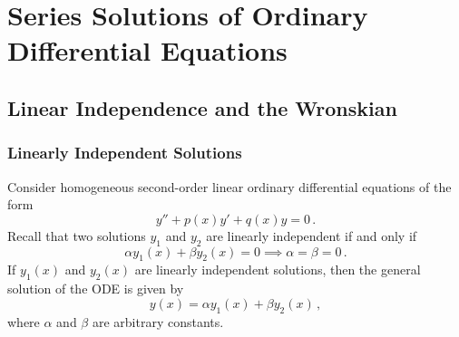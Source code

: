 \documentclass{article}
\theoremstyle{plain}\theoremheaderfont{\normalfont\itshape}\theorembodyfont{\rmfamily}\theoremseparator{.}\newtheorem*{rem}{Remark}\newtheorem*{ex}{Example}\newtheorem*{proof}{Proof}\newtheorem*{altp}{Alternative proof}
\theoremstyle{plain}\theoremheaderfont{\normalfont\bfseries}\theorembodyfont{\rmfamily}\theoremseparator{.}\newtheorem{thm}{Theorem}[section]\newtheorem{lem}[thm]{Lemma}\newtheorem{prop}[thm]{Proposition}\newtheorem*{cor}{Corollary}\newtheorem{defn}[thm]{Definition}\newtheorem{clm}[thm]{Claim}\newtheorem{clminproof}{Claim}
\theoremstyle{break}\theoremheaderfont{\normalfont\itshape}\theorembodyfont{\rmfamily}\theoremseparator{.\medskip}\newtheorem*{proofskip}{Proof}\newtheorem*{exs}{Examples}\newtheorem*{rems}{Remarks}
\theoremstyle{break}\theoremheaderfont{\normalfont\bfseries}\theorembodyfont{\rmfamily}\theoremseparator{.\medskip}\newtheorem{lemskip}[thm]{Lemma}\newtheorem{defnskip}[thm]{Definition}\newtheorem{propskip}[thm]{Proposition}\newtheorem{thmskip}[thm]{Theorem}
\numberwithin{equation}{section}
\begin{document}
	\newpage

	\section{Series Solutions of Ordinary Differential Equations}
	\subsection{Linear Independence and the Wronskian}
	\subsubsection{Linearly Independent Solutions}
	Consider homogeneous second-order linear ordinary differential equations of the form
	\begin{equation}\tag{\(\dagger\)}
		y''+p(x)y'+q(x)y=0\,.
	\end{equation}
	Recall that two solutions \(y_1\) and \(y_2\) are linearly independent if and only if
	\[\alpha y_1(x)+\beta y_2(x)=0\implies \alpha=\beta=0\,.\]
	If \(y_1(x)\) and \(y_2(x)\) are linearly independent solutions, then the general solution of the ODE is given by
	\[y(x)=\alpha y_1(x)+\beta y_2(x)\,,\]
	where \(\alpha\) and \(\beta\) are arbitrary constants. 
\end{document}
